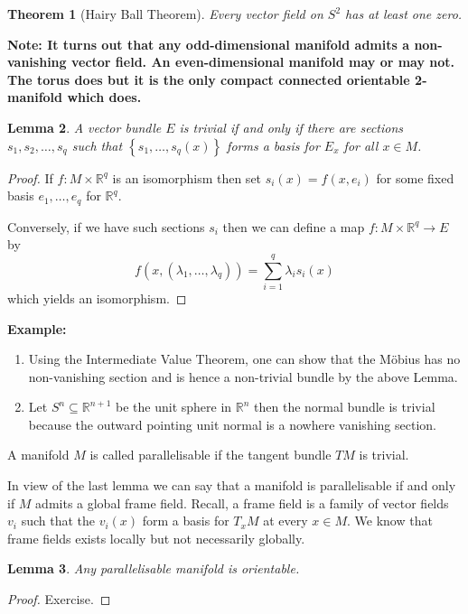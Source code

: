 \documentclass[11pt]{article}
\newcommand{\R}{\mathbb{R}}
\newenvironment{defin}
	{\begin{mdframed}[backgroundcolor=white, roundcorner=5pt, linewidth=1pt, linecolor=Green]
		\setlength{\parindent}{0pt}}
	{\end{mdframed}}
\newcommand{\mdf}[1]{{\color{Green} #1}}
\newenvironment{note}
	{\begin{mdframed}[backgroundcolor=white, linecolor=red, roundcorner=5pt, linewidth=1pt]\bfseries{Note:}\normalfont
	\setlength{\parindent}{0pt}}
	{\end{mdframed}}
\newenvironment{eg}
	{\begin{mdframed}[backgroundcolor=mylg,roundcorner=5pt,linewidth=0pt]\bfseries{Example:}\normalfont
	\setlength{\parindent}{0pt}}
	{\end{mdframed}}
\newtheorem{theorem}{Theorem}[section]
\newtheorem{lemma}[theorem]{Lemma}
\begin{document}
\begin{theorem}[Hairy Ball Theorem]
Every vector field on $S^2$ has at least one zero.
\end{theorem}

\begin{note}
	It turns out that any odd-dimensional manifold admits a non-vanishing vector field.
	An even-dimensional manifold may or may not.
	The torus does but it is the only compact connected orientable 2-manifold which does.
\end{note}

\begin{lemma}
A vector bundle $E$ is trivial if and only if there are sections $s_1, s_2, \dots, s_q$ such that $\left\{s_1, \dots, s_q(x)\right\}$ forms a basis for $E_x$ for all $x\in M$.
\end{lemma}
\begin{proof}
If $f:M\times \R^q$ is an isomorphism then set $s_i(x)=f(x, e_i)$ for some fixed basis $e_1, \dots , e_q$ for $\R^q$.

Conversely, if we have such sections $s_i$ then we can define a map $f:M\times \R^q \to E$ by
\[
	f(x, (\lambda_1, \dots , \lambda_q))=\sum_{i=1}^{q}\lambda_i s_i(x)
\]
which yields an isomorphism.
\end{proof}
\begin{eg}
	\begin{enumerate}
		\item Using the Intermediate Value Theorem, one can show that the M\"obius has no non-vanishing section and is hence a non-trivial bundle by the above Lemma.
		\item Let $S^n\subseteq\R^{n+1}$ be the unit sphere in $\R^n$ then the normal bundle is trivial because the outward pointing unit normal is a nowhere vanishing section.
	\end{enumerate}
\end{eg}

\begin{defin}
	A manifold $M$ is called \mdf{parallelisable} if the tangent bundle $TM$ is trivial.
\end{defin}

In view of the last lemma we can say that a manifold is parallelisable if and only if $M$ admits a global frame field.
Recall, a frame field is a family of vector fields $v_i$ such that the $v_i(x)$ form a basis for $T_x M$ at every $x\in M$.
We know that frame fields exists locally but not necessarily globally.

\begin{lemma}
Any parallelisable manifold is orientable.
\end{lemma}
\begin{proof}
Exercise.
\end{proof}
\end{document}
